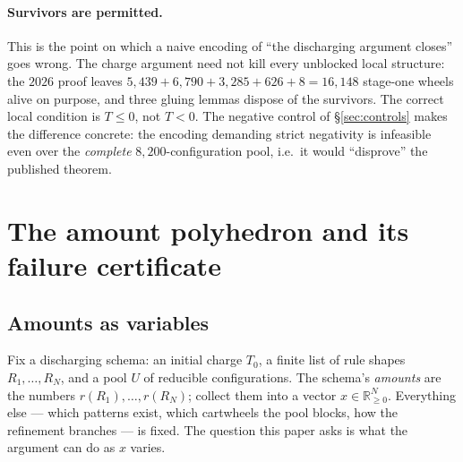 \documentclass[11pt]{article}
\theoremstyle{definition}
\begin{document}
\paragraph{Survivors are permitted.} This is the point on which a naive encoding
of ``the discharging argument closes'' goes wrong. The charge argument need not
kill every unblocked local structure: the $2026$ proof leaves
$5{,}439 + 6{,}790 + 3{,}285 + 626 + 8 = 16{,}148$ stage-one wheels alive on
purpose, and three gluing lemmas dispose of the survivors. The correct local
condition is $T \le 0$, not $T < 0$. The negative control of
\S\ref{sec:controls} makes the difference concrete: the encoding demanding
strict negativity is infeasible even over the \emph{complete}
$8{,}200$-configuration pool, i.e.\ it would ``disprove'' the published
theorem.
\section{The amount polyhedron and its failure certificate}
\label{sec:lp}

\subsection{Amounts as variables}

Fix a discharging schema: an initial charge $T_0$, a finite list of rule shapes
$R_1,\dots,R_N$, and a pool $U$ of reducible configurations. The schema's
\emph{amounts} are the numbers $r(R_1),\dots,r(R_N)$; collect them into a vector
$x \in \mathbb{R}^N_{\ge0}$. Everything else --- which patterns exist, which
cartwheels the pool blocks, how the refinement branches --- is fixed. The
question this paper asks is what the argument can do as $x$ varies.
\end{document}
